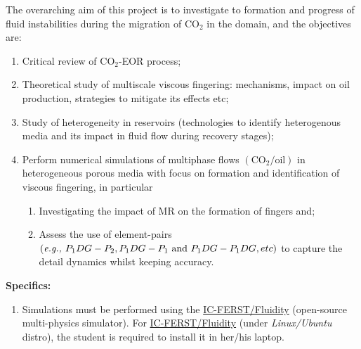 \documentclass[12pts,a4paper,amsmath,amssymb,floatfix]{article}%
\newcommand{\eg}{{\it e.g., }}
\begin{document}
\begin{enumerate}[label=\bfseries Project: \arabic*:]
  The overarching aim of this project is to investigate to formation and progress of fluid instabilities during the migration of CO$_{2}$ in the domain, and the objectives are:
\begin{enumerate}
\item Critical review of CO$_{2}$-EOR process;
\item Theoretical study of multiscale viscous fingering: mechanisms, impact on oil production, strategies to mitigate its effects etc;
\item Study of heterogeneity in reservoirs (technologies to identify heterogenous media and its impact in fluid flow during recovery stages);
\item Perform numerical simulations of multiphase flows $\left(\text{CO}_{2}\text{/oil}\right)$ in heterogeneous porous media with focus on formation and identification of viscous fingering, in particular 
  \begin{enumerate}
     \item Investigating the impact of MR on the formation of fingers and;
     \item Assess the use of element-pairs $\left(\text{\eg} P_{1}DG-P_{2}, P_{1}DG-P_{1} \text{ and }  P_{1}DG-P_{1}DG, etc\right)$ to capture the detail dynamics whilst keeping accuracy.
  \end{enumerate} 
\end{enumerate}
  
\noindent
{\bf Specifics:} 
\begin{enumerate}
\item Simulations must be performed using the \href{http://multifluids.github.io/}{IC-FERST/Fluidity} (open-source multi-physics simulator). For  \href{http://multifluids.github.io/}{IC-FERST/Fluidity} (under {\it Linux/Ubuntu} distro), the student is required to install it in her/his laptop.  
\end{enumerate}



\end{enumerate}
\end{document}
